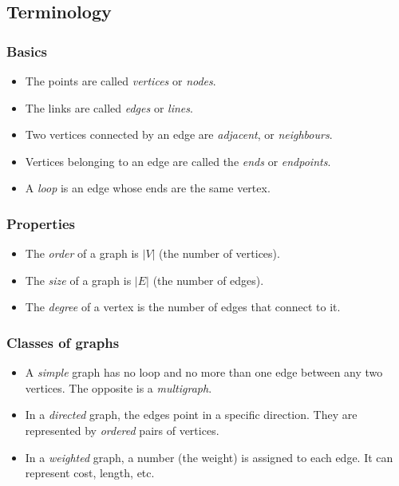 \subsection{Terminology}

\subsubsection{Basics}

\begin{itemize}
    \item The points are called \emph{vertices} or \emph{nodes}.
    \item The links are called \emph{edges} or \emph{lines}.
	\item Two vertices connected by an edge are \emph{adjacent},
		or \emph{neighbours}.
    \item Vertices belonging to an edge are called the \emph{ends} 
        or \emph{endpoints}.
    \item A \emph{loop} is an edge whose ends are the same vertex.
\end{itemize}

\subsubsection{Properties}

\begin{itemize}
    \item The \emph{order} of a graph is $|V|$ (the number of vertices).
    \item The \emph{size} of a graph is $|E|$ (the number of edges).
    \item The \emph{degree} of a vertex is the number of edges
        that connect to it.
\end{itemize}

\subsubsection{Classes of graphs}

\begin{itemize}
    \item A \emph{simple} graph has no loop and no more than one edge
        between any two vertices. The opposite is a \emph{multigraph}.
    \item In a \emph{directed} graph, the edges point in a specific direction.
        They are represented by \emph{ordered} pairs of vertices.
    \item In a \emph{weighted} graph, a number (the weight) is assigned to each
        edge. It can represent cost, length, etc.
\end{itemize}

